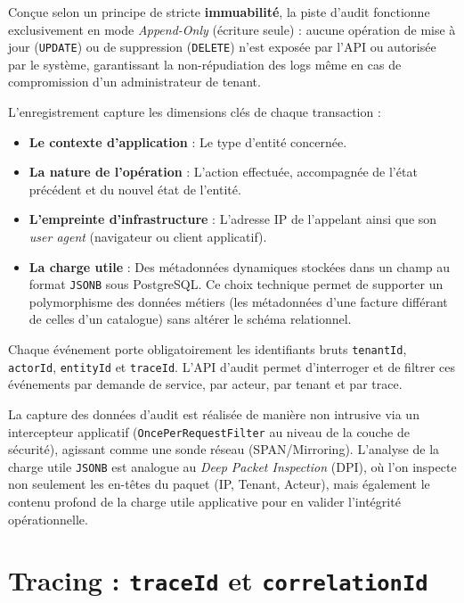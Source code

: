 Conçue selon un principe de stricte \textbf{immuabilité}, la piste d'audit fonctionne exclusivement en mode \emph{Append-Only} (écriture seule) : aucune opération de mise à jour (\texttt{UPDATE}) ou de suppression (\texttt{DELETE}) n'est exposée par l'API ou autorisée par le système, garantissant la non-répudiation des logs même en cas de compromission d'un administrateur de tenant.

L'enregistrement capture les dimensions clés de chaque transaction :
\begin{itemize}
  \item \textbf{Le contexte d'application} : Le type d'entité concernée.
  \item \textbf{La nature de l'opération} : L'action effectuée, accompagnée de l'état précédent et du nouvel état de l'entité.
  \item \textbf{L'empreinte d'infrastructure} : L'adresse IP de l'appelant ainsi que son \emph{user agent} (navigateur ou client applicatif).
  \item \textbf{La charge utile} : Des métadonnées dynamiques stockées dans un champ au format \texttt{JSONB} sous PostgreSQL. Ce choix technique permet de supporter un polymorphisme des données métiers (les métadonnées d'une facture différant de celles d'un catalogue) sans altérer le schéma relationnel.
\end{itemize}

Chaque événement porte obligatoirement les identifiants bruts \texttt{tenantId}, \texttt{actorId}, \texttt{entityId} et \texttt{traceId}. L'API d'audit permet d'interroger et de filtrer ces événements par demande de service, par acteur, par tenant et par trace.

\begin{analogie}
La capture des données d'audit est réalisée de manière non intrusive via un intercepteur applicatif (\texttt{OncePerRequestFilter} au niveau de la couche de sécurité), agissant comme une sonde réseau (SPAN/Mirroring). L'analyse de la charge utile \texttt{JSONB} est analogue au \emph{Deep Packet Inspection} (DPI), où l'on inspecte non seulement les en-têtes du paquet (IP, Tenant, Acteur), mais également le contenu profond de la charge utile applicative pour en valider l'intégrité opérationnelle.
\end{analogie}

\section{Tracing : \texttt{traceId} et \texttt{correlationId}}

